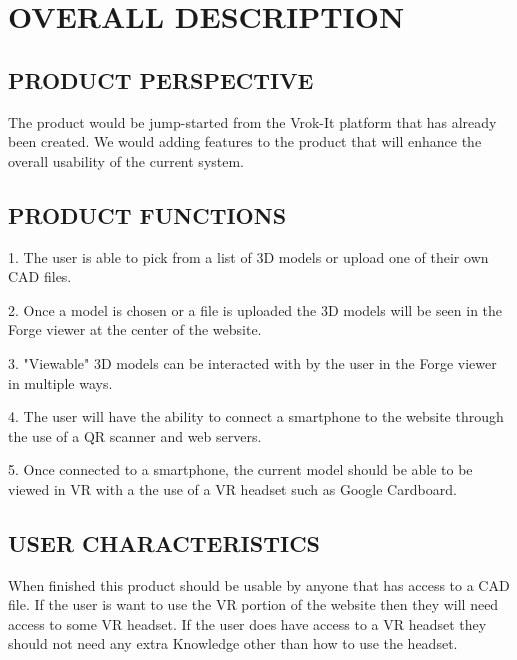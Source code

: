 \documentclass[letterpaper, 10pt, draftclsnofoot, compsoc, onecolumn]{IEEEtran}
\begin{document}
\clearpage

\section[OVERALL
DESCRIPTION]{\rmfamily\bfseries\color{black}
OVERALL DESCRIPTION}

\subsection[PRODUCT
PERSPECTIVE]{\rmfamily\bfseries\color{black}
PRODUCT PERSPECTIVE}
	The product would be jump-started from the Vrok-It platform that has already been created. 
	We would adding features to the product that will enhance the overall usability of the current system. 

\subsection[PRODUCT
FUNCTIONS]{\rmfamily\bfseries\color{black}
PRODUCT FUNCTIONS}
	\begin{flushleft}
	1. The user is able to pick from a list of 3D models or upload one of their own CAD files. \newline

	2. Once a model is chosen or a file is uploaded the 3D models will be seen in the Forge viewer at the 
	center of the website.\newline

	3. "Viewable" 3D models can be interacted with by the user in the Forge viewer in multiple ways.\newline

	4. The user will have the ability to connect a smartphone to the website through the use of a QR scanner
	and web servers. \newline

	5. Once connected to a smartphone, the current model should be able to be viewed in VR with a the use
	of a VR headset such as Google Cardboard. 
	\end{flushleft}

\subsection[USER
CHARACTERISTICS]{\rmfamily\bfseries\color{black}
USER CHARACTERISTICS}
	When finished this product should be usable by anyone that has access to a CAD file. If the user is want to use the VR 
	portion of the website then they will need access to some VR headset. If the user does have access to a VR headset they 
	should not need any extra Knowledge other than how to use the headset.  
\end{document}
